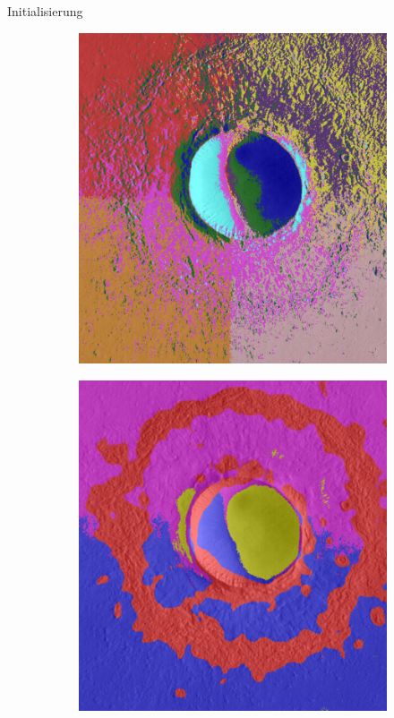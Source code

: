 \documentclass{beamer}
\begin{document}
\begin{frame}{Initialisierung}
\begin{minipage}{0.20\textwidth}
\begin{figure}[h!]
\begin{subfigure}{\textwidth}
			\end{subfigure}
			\begin{subfigure}{\textwidth}
				\includegraphics[width=\textwidth,keepaspectratio]{gfx/Gre13_01.jpg_slic.png}
			\end{subfigure}
			\begin{subfigure}{\textwidth}
				\includegraphics[width=\textwidth,keepaspectratio]{gfx/Gre13_01.jpg_tsugf.png}

\end{subfigure}
\end{figure}
\end{minipage}
\end{frame}
\end{document}
